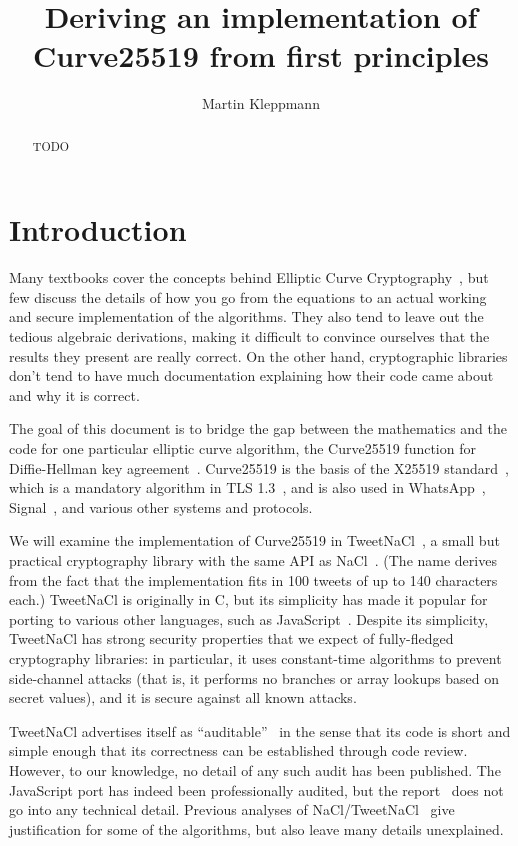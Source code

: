 \documentclass{article}
\begin{document}
\title{Deriving an implementation of Curve25519 from first principles}
\author{Martin Kleppmann}
\date{}
\maketitle
\begin{abstract}
TODO
\end{abstract}

\section{Introduction}

Many textbooks cover the concepts behind Elliptic Curve Cryptography~\cite{Cohen:2006,Hankerson:2004}, but few discuss the details of how you go from the equations to an actual working and secure implementation of the algorithms.
They also tend to leave out the tedious algebraic derivations, making it difficult to convince ourselves that the results they present are really correct.
On the other hand, cryptographic libraries don't tend to have much documentation explaining how their code came about and why it is correct.

The goal of this document is to bridge the gap between the mathematics and the code for one particular elliptic curve algorithm, the Curve25519 function for Diffie-Hellman key agreement~\cite{Bernstein:2006kw}.
Curve25519 is the basis of the X25519 standard~\cite{X25519}, which is a mandatory algorithm in TLS 1.3~\cite{TLS13}, and is also used in WhatsApp~\cite{WhatsAppWhitepaper}, Signal~\cite{Marlinspike:2016}, and various other systems and protocols.

We will examine the implementation of Curve25519 in TweetNaCl~\cite{Bernstein:2014ca,TweetNaCl}, a small but practical cryptography library with the same API as NaCl~\cite{NaCl,Bernstein:2012}.
(The name derives from the fact that the implementation fits in 100 tweets of up to 140 characters each.)
TweetNaCl is originally in C, but its simplicity has made it popular for porting to various other languages, such as JavaScript~\cite{TweetNaCljs}.
Despite its simplicity, TweetNaCl has strong security properties that we expect of fully-fledged cryptography libraries: in particular, it uses constant-time algorithms to prevent side-channel attacks (that is, it performs no branches or array lookups based on secret values), and it is secure against all known attacks.

TweetNaCl advertises itself as ``auditable''~\cite{Bernstein:2014ca} in the sense that its code is short and simple enough that its correctness can be established through code review.
However, to our knowledge, no detail of any such audit has been published.
The JavaScript port has indeed been professionally audited, but the report~\cite{TweetNaClAudit} does not go into any technical detail.
Previous analyses of NaCl/TweetNaCl~\cite{Bernstein:2009,Janssen:2014} give justification for some of the algorithms, but also leave many details unexplained.
\end{document}
